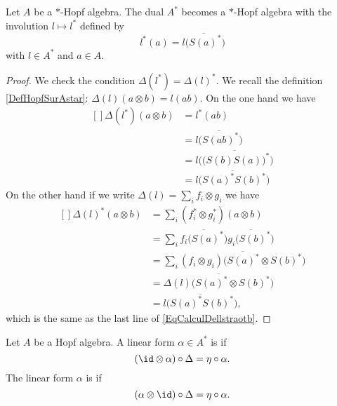 \begin{proposition}     \label{PropAstarstaralg}
	Let \( A\) be a \( *\)-Hopf algebra. The dual \( A^*\) becomes a \( *\)-Hopf algebra with the involution \( l\mapsto l^*\) defined by
	\begin{equation}
		l^*(a)=\overline{ l\big( S(a)^* \big) }
	\end{equation}
	with \( l\in A^*\) and \( a\in A\).
\end{proposition}

\begin{proof}
	We check the condition \( \Delta(l^*)=\Delta(l)^*\). We recall the definition \eqref{DefHopfSurAstar}: \( \Delta(l)(a\otimes b)=l(ab)\). On the one hand we have
	\begin{equation}        \label{EqCalculDellstraotb}
		\begin{aligned}[]
			\Delta(l^*)(a\otimes b) & =l^*(ab)                                            \\
			                        & =\overline{ l\big( S(ab)^* \big) }                  \\
			                        & =\overline{ l\Big(   \big( S(b)S(a) \big)^* \Big) } \\
			                        & =\overline{ l\big( S(a)^*S(b)^* \big) }
		\end{aligned}
	\end{equation}
	On the other hand if we write \( \Delta(l)=\sum_if_i\otimes g_i\) we have
	\begin{equation}
		\begin{aligned}[]
			\Delta(l)^*(a\otimes b) & =\sum_i(f_i^*\otimes g_i^*)(a\otimes b)                                    \\
			                        & =\sum_i\overline{ f_i\big( S(a)^* \big) }\overline{ g_i\big( S(b)^* \big)} \\
			                        & =\sum_i\overline{ (f_i\otimes g_i)\big( S(a)^*\otimes S(b)^* \big) }       \\
			                        & =\overline{ \Delta(l)\big( S(a)^*\otimes S(b)^* \big) }                    \\
			                        & =\overline{ l\big( S(a)^*S(b)^* \big) },
		\end{aligned}
	\end{equation}
	which is the same as the last line of \eqref{EqCalculDellstraotb}.
\end{proof}

Let \( A\) be a Hopf algebra. A linear form \( \alpha\in A^*\) is  if
\begin{equation}
	(\id\otimes\alpha)\circ\Delta=\eta\circ\alpha.
\end{equation}
The linear form \( \alpha\) is  if
\begin{equation}
	(\alpha\otimes\id)\circ\Delta=\eta\circ\alpha.
\end{equation}

